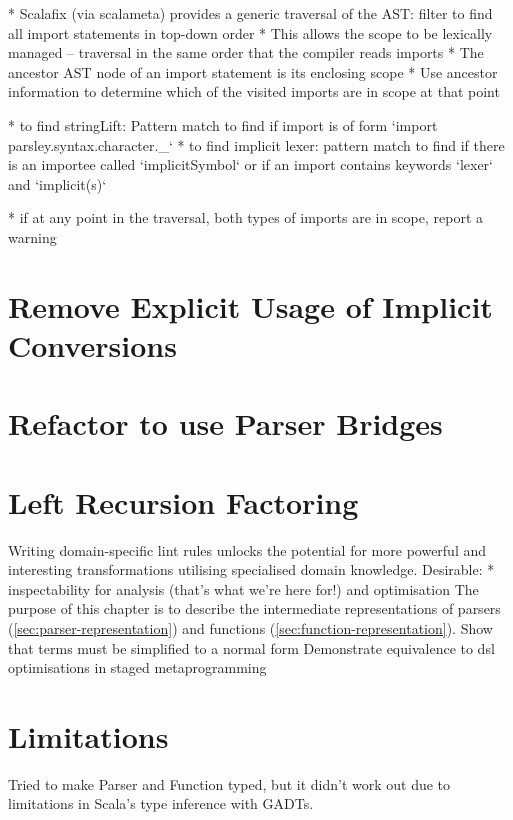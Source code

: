 \documentclass[../../main.tex]{subfiles}
\begin{document}
* Scalafix (via scalameta) provides a generic traversal of the AST: filter to find all import statements in top-down order
* This allows the scope to be lexically managed -- traversal in the same order that the compiler reads imports
* The ancestor AST node of an import statement is its enclosing scope
* Use ancestor information to determine which of the visited imports are in scope at that point

* to find stringLift: Pattern match to find if import is of form `import parsley.syntax.character.\_`
* to find implicit lexer: pattern match to find if there is an importee called `implicitSymbol` or if an import contains keywords `lexer` and `implicit(s)`

* if at any point in the traversal, both types of imports are in scope, report a warning

\section{Remove Explicit Usage of Implicit Conversions}

\section{Refactor to use Parser Bridges}

\section{Left Recursion Factoring}\label{sec:factor-leftrec}

Writing domain-specific lint rules unlocks the potential for more powerful and interesting transformations utilising specialised domain knowledge.
Desirable:
* inspectability for analysis (that's what we're here for!) and optimisation
The purpose of this chapter is to describe the intermediate representations of parsers (\cref{sec:parser-representation}) and functions (\cref{sec:function-representation}).
Show that terms must be simplified to a normal form
Demonstrate equivalence to dsl optimisations in staged metaprogramming




\section{Limitations}
Tried to make Parser and Function typed, but it didn't work out due to limitations in Scala's type inference with GADTs.
\end{document}
